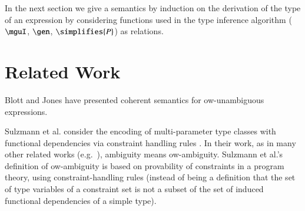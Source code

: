 \documentclass[review]{elsarticle}
\begin{document}
In the next section we give a semantics by induction on the derivation
of the type of an expression by considering functions used in the type
inference algorithm ($\mguI$, $\gen$, $\simplifies{P}$) as relations.



\section{Related Work}
\label{Related-work}


Blott \cite{BlottPhD} and Jones \cite{MarkJones94a} have presented
coherent semantics for ow-unambiguous expressions.

Sulzmann et al. \cite{Understanding-FDs-via-CHRs} consider the
encoding of multi-parameter type classes with functional dependencies
via constraint handling rules \cite{CHRs}. In their work, as in many
other related works (e.g.~\cite{Parametric-type-classes}), ambiguity
means ow-ambiguity. Sulzmann et al.'s definition of ow-ambiguity is
based on provability of constraints in a program theory, using
constraint-handling rules (instead of being a definition that the set
of type variables of a constraint set is not a subset of the set of
induced functional dependencies of a simple type).
\end{document}
